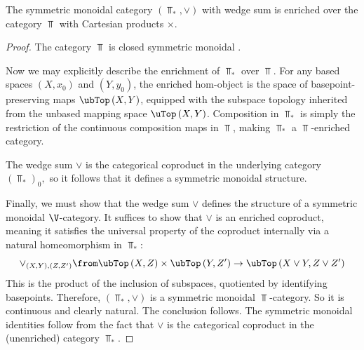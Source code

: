 \documentclass{tac}
\def\bTop{{\Top_\ast}}
\begin{document}
\begin{proposition}
\label{enrich}
    The symmetric monoidal category $(\bTop, \vee)$ with wedge sum is enriched over the category $\Top$ with Cartesian products $\times$.
\end{proposition}
\begin{proof}
   The category $\Top$ is closed symmetric monoidal \cite{steenrod67}.
   
   Now we may explicitly describe the enrichment of $\bTop$ over $\Top$. For any based spaces $\left(X, x_0\right)$ and $\left(Y, y_0\right)$, the enriched hom-object is the space of basepoint-preserving maps $\ubTop\left(X, Y\right)$, equipped with the subspace topology inherited from the unbased mapping space $\uTop\left(X, Y\right)$. Composition in $\bTop$ is simply the restriction of the continuous composition maps in $\Top$, making $\bTop$ a $\Top$-enriched category. 
   
   The wedge sum $\vee$ is the categorical coproduct in the underlying category $\left(\bTop\right)_0,$ so it follows that it defines a symmetric monoidal structure.

   Finally, we must show that the wedge sum $\vee$ defines the structure of a symmetric monoidal $\V$-category. It suffices to show that $\vee$ is an enriched coproduct, meaning it satisfies the universal property of the coproduct internally via a natural homeomorphism in $\bTop$:
   $$
   \vee_{(X, Y), (Z, Z')} \from \ubTop\left(X, Z\right) \times \ubTop\left(Y, Z'\right) \to  \ubTop\left(X \vee Y, Z\vee Z'\right)  
   $$
   This is the product of the inclusion of subspaces, quotiented by identifying basepoints.  Therefore, $\left(\bTop, \vee\right)$ is a symmetric monoidal $\Top$-category.  So it is continuous and clearly natural. The conclusion follows. The symmetric monoidal identities follow from the fact that $\vee$ is the categorical coproduct in the (unenriched) category $\bTop.$
\end{proof}
\end{document}
